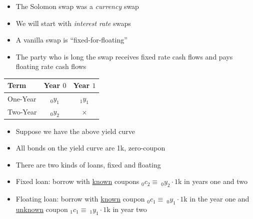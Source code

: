 \begin{frame}{}
    \begin{itemize}
        \item The Solomon swap was a \textit{currency} swap
        \item We will start with \textit{interest rate} swaps
        \item A vanilla swap is ``fixed-for-floating''
        \item The party who is long the swap receives fixed rate cash flows and pays floating rate cash flows 
    \end{itemize}
\end{frame}

\begin{frame}{}
    \begin{center}
        \begin{tabular}{lcc}
            Term & Year $0$ & Year $1$ \\ \hline
            One-Year & $_{0}y_{1}$ & $_{1}y_{1}$ \\
            Two-Year & $_{0}y_{2}$ & $\times$
        \end{tabular}
    \end{center}
    \begin{itemize}
        \item Suppose we have the above yield curve
        \item All bonds on the yield curve are 1k, zero-coupon
        \item There are two kinds of loans, fixed and floating
        \item Fixed loan: borrow with \underline{known} coupons $_{0}c_{2}\equiv\:_{0}y_{2}\cdot 1$k in years one and two 
        \item Floating loan: borrow with \underline{known} coupon $_{0}c_{1}\equiv\:_{0}y_{1}\cdot 1$k in the year one and \underline{unknown} coupon $_{1}c_{1}\equiv\:_{1}y_{1}\cdot 1$k in year two
    \end{itemize}
\end{frame}

